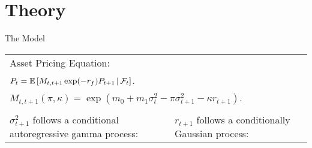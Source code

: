 \documentclass[smaller, aspectratio=169]{beamer}
\let\emph\relax
\begin{document}
\section{Theory}

\begin{frame}[c]{The Model}

    \begin{tabularx}{\textwidth}{X | X}
        \multicolumn{2}{l}{Asset Pricing Equation:} \\
%
        \multicolumn{2}{l}{\emph{--} $\displaystyle P_t = \mathbb{E}\left[M_{t, t+1} \exp(-r_f) P_{t+1} \,\middle\vert\, \mathcal{F}_{t} \right]$.} \\
%
        \multicolumn{2}{l}{\emph{--} $\displaystyle M_{t, t+1}(\pi, \kappa) = \exp\left(m_0 + m_1 \sigma^2_t - \pi \sigma^2_{t+1} - \kappa r_{t+1}\right)$.} \\ 
%
        \midrule \\
%
    $\sigma^2_{t+1}$ follows a conditional autoregressive gamma process: & $r_{t+1}$ follows a conditionally Gaussian process: \\

    \end{tabularx}
\end{frame}
\end{document}
